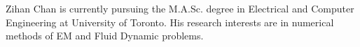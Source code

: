 \documentclass[journal]{IEEEtran}
\begin{document}
%
%
%
% 

\begin{IEEEbiographynophoto}{Zihan Chan}
 is currently pursuing the M.A.Sc. degree in Electrical and Computer Engineering 
at University of Toronto. His research interests are in numerical methods of EM and Fluid Dynamic problems.
\end{IEEEbiographynophoto}







\end{document}
